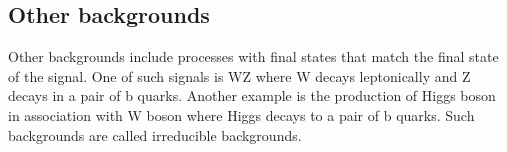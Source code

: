 \subsection{Other backgrounds}
Other backgrounds include processes with final states that match the final state of the signal. One of such signals is WZ where W decays leptonically and Z decays in a pair of b quarks. Another example is the production of Higgs boson in association with W boson where Higgs  decays to a pair of b quarks. Such backgrounds are called irreducible backgrounds.


